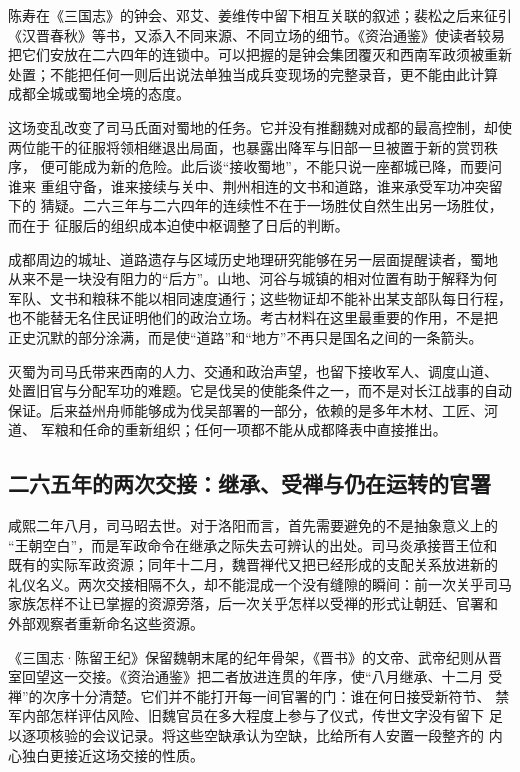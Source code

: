 \begin{sourcenote}[成都兵变为何不能写成一段无缝的戏剧]
陈寿在《三国志》的钟会、邓艾、姜维传中留下相互关联的叙述；裴松之后来征引
《汉晋春秋》等书，又添入不同来源、不同立场的细节。《资治通鉴》使读者较易
把它们安放在二六四年的连锁中。可以把握的是钟会集团覆灭和西南军政须被重新
处置；不能把任何一则后出说法单独当成兵变现场的完整录音，更不能由此计算
成都全城或蜀地全境的态度。
\end{sourcenote}

这场变乱改变了司马氏面对蜀地的任务。它并没有推翻魏对成都的最高控制，却使
两位能干的征服将领相继退出局面，也暴露出降军与旧部一旦被置于新的赏罚秩序，
便可能成为新的危险。此后谈“接收蜀地”，不能只说一座都城已降，而要问谁来
重组守备，谁来接续与关中、荆州相连的文书和道路，谁来承受军功冲突留下的
猜疑。二六三年与二六四年的连续性不在于一场胜仗自然生出另一场胜仗，而在于
征服后的组织成本迫使中枢调整了日后的判断。

成都周边的城址、道路遗存与区域历史地理研究能够在另一层面提醒读者，蜀地
从来不是一块没有阻力的“后方”。山地、河谷与城镇的相对位置有助于解释为何
军队、文书和粮秣不能以相同速度通行；这些物证却不能补出某支部队每日行程，
也不能替无名住民证明他们的政治立场。考古材料在这里最重要的作用，不是把
正史沉默的部分涂满，而是使“道路”和“地方”不再只是国名之间的一条箭头。

\begin{turningpoint}[灭蜀留下的不是一把可立即使用的钥匙]
灭蜀为司马氏带来西南的人力、交通和政治声望，也留下接收军人、调度山道、
处置旧官与分配军功的难题。它是伐吴的使能条件之一，而不是对长江战事的自动
保证。后来益州舟师能够成为伐吴部署的一部分，依赖的是多年木材、工匠、河道、
军粮和任命的重新组织；任何一项都不能从成都降表中直接推出。
\end{turningpoint}

\subsection{二六五年的两次交接：继承、受禅与仍在运转的官署}

咸熙二年八月，司马昭去世。对于洛阳而言，首先需要避免的不是抽象意义上的
“王朝空白”，而是军政命令在继承之际失去可辨认的出处。司马炎承接晋王位和
既有的实际军政资源；同年十二月，魏晋禅代又把已经形成的支配关系放进新的
礼仪名义。两次交接相隔不久，却不能混成一个没有缝隙的瞬间：前一次关乎司马
家族怎样不让已掌握的资源旁落，后一次关乎怎样以受禅的形式让朝廷、官署和
外部观察者重新命名这些资源。

《三国志·陈留王纪》保留魏朝末尾的纪年骨架，《晋书》的文帝、武帝纪则从晋
室回望这一交接。《资治通鉴》把二者放进连贯的年序，使“八月继承、十二月
受禅”的次序十分清楚。它们并不能打开每一间官署的门：谁在何日接受新符节、
禁军内部怎样评估风险、旧魏官员在多大程度上参与了仪式，传世文字没有留下
足以逐项核验的会议记录。将这些空缺承认为空缺，比给所有人安置一段整齐的
内心独白更接近这场交接的性质。

